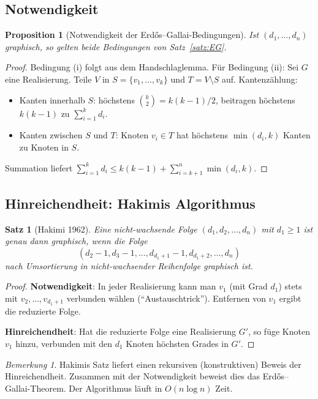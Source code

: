 \documentclass[12pt,a4paper]{amsart}
\newtheorem{proposition}[theorem]{Proposition}
\newtheorem{satz}[theorem]{Satz}
\theoremstyle{definition}
\theoremstyle{remark}
\newtheorem{bemerkung}[theorem]{Bemerkung}
\begin{document}
\subsection{Notwendigkeit}

\begin{proposition}[Notwendigkeit der Erd\H{o}s--Gallai-Bedingungen]
Ist $(d_1, \ldots, d_n)$ graphisch, so gelten beide Bedingungen von
Satz~\ref{satz:EG}.
\end{proposition}

\begin{proof}
Bedingung (i) folgt aus dem Handschlaglemma.
Für Bedingung (ii): Sei $G$ eine Realisierung.
Teile $V$ in $S = \{v_1, \ldots, v_k\}$ und $T = V \setminus S$ auf.
Kantenzählung:
\begin{itemize}[nosep]
  \item Kanten innerhalb $S$: höchstens $\binom{k}{2} = k(k-1)/2$, beitragen
        höchstens $k(k-1)$ zu $\sum_{i=1}^k d_i$.
  \item Kanten zwischen $S$ und $T$: Knoten $v_i \in T$ hat höchstens
        $\min(d_i, k)$ Kanten zu Knoten in $S$.
\end{itemize}
Summation liefert $\sum_{i=1}^k d_i \leq k(k-1) + \sum_{i=k+1}^n \min(d_i, k)$.
\end{proof}

\subsection{Hinreichendheit: Hakimis Algorithmus}

\begin{satz}[Hakimi 1962]
\label{satz:hakimi}
Eine nicht-wachsende Folge $(d_1, d_2, \ldots, d_n)$ mit $d_1 \geq 1$ ist
genau dann graphisch, wenn die Folge
\[
  (d_2 - 1, d_3 - 1, \ldots, d_{d_1+1} - 1, d_{d_1+2}, \ldots, d_n)
\]
nach Umsortierung in nicht-wachsender Reihenfolge graphisch ist.
\end{satz}

\begin{proof}
\textbf{Notwendigkeit}: In jeder Realisierung kann man $v_1$ (mit Grad $d_1$)
stets mit $v_2, \ldots, v_{d_1+1}$ verbunden wählen (``Austauschtrick'').
Entfernen von $v_1$ ergibt die reduzierte Folge.

\textbf{Hinreichendheit}: Hat die reduzierte Folge eine Realisierung $G'$,
so füge Knoten $v_1$ hinzu, verbunden mit den $d_1$ Knoten höchsten Grades in $G'$.
\end{proof}

\begin{bemerkung}
Hakimis Satz liefert einen rekursiven (konstruktiven) Beweis der Hinreichendheit.
Zusammen mit der Notwendigkeit beweist dies das Erd\H{o}s--Gallai-Theorem.
Der Algorithmus läuft in $O(n \log n)$ Zeit.
\end{bemerkung}
\end{document}
